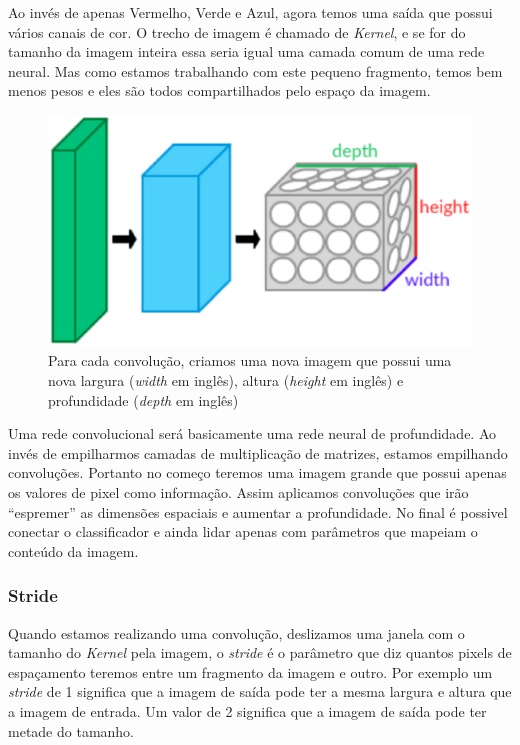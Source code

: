 Ao invés de apenas Vermelho, Verde e Azul, agora temos uma saída que
possui vários canais de cor. O trecho de imagem é chamado de
\textit{Kernel}, e se for do tamanho da imagem inteira essa seria
igual uma camada comum de uma rede neural. Mas como estamos
trabalhando com este pequeno fragmento, temos bem menos pesos e eles
são todos compartilhados pelo espaço da imagem.

\begin{figure}[H]
\centering
\includegraphics[scale=0.6]{imagens/Conv_layers.eps}
\caption{Para cada convolução, criamos uma nova imagem que possui uma
  nova largura (\textit{width} em inglês), altura (\textit{height} em
  inglês) e profundidade (\textit{depth} em inglês)}
\label{fig:convolution_kernel}
\end{figure}

Uma rede convolucional será basicamente uma rede neural de
profundidade. Ao invés de empilharmos camadas de multiplicação de
matrizes, estamos empilhando convoluções. Portanto no começo teremos
uma imagem grande que possui apenas os valores de pixel como
informação. Assim aplicamos convoluções que irão ``espremer'' as
dimensões espaciais e aumentar a profundidade. No final é possivel
conectar o classificador e ainda lidar apenas com parâmetros que
mapeiam o conteúdo da imagem.\cite{Dumoulin2016}

\subsubsection{Stride}

Quando estamos realizando uma convolução, deslizamos uma janela com o
tamanho do \textit{Kernel} pela imagem, o \textit{stride} é o
parâmetro que diz quantos pixels de espaçamento teremos entre um
fragmento da imagem e outro. Por exemplo um \textit{stride} de 1
significa que a imagem de saída pode ter a mesma largura e altura que
a imagem de entrada. Um valor de 2 significa que a imagem de saída
pode ter metade do tamanho.

